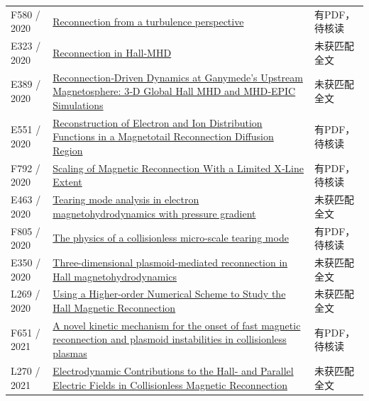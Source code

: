 \begin{longtable}{P{24mm}P{97mm}P{27mm}}
F580 / 2020 & \href{https://doi.org/10.1063/1.5128376}{Reconnection from a turbulence perspective} & 有PDF，待核读\\

E323 / 2020 & \href{http://absimage.aps.org/image/DPP20/MWS_DPP20-2020-001941.pdf}{Reconnection in Hall-MHD} & 未获匹配全文\\

E389 / 2020 & \href{https://doi.org/10.1029/2020ja028162}{Reconnection‐Driven Dynamics at Ganymede's Upstream Magnetosphere: 3‐D Global Hall MHD and MHD‐EPIC Simulations} & 未获匹配全文\\

E551 / 2020 & \href{https://doi.org/10.1029/2020ja027879}{Reconstruction of Electron and Ion Distribution Functions in a Magnetotail Reconnection Diffusion Region} & 有PDF，待核读\\

F792 / 2020 & \href{https://doi.org/10.1029/2020gl088147}{Scaling of Magnetic Reconnection With a Limited X‐Line Extent} & 有PDF，待核读\\

E463 / 2020 & \href{https://doi.org/10.1063/5.0022332}{Tearing mode analysis in electron magnetohydrodynamics with pressure gradient} & 未获匹配全文\\

F805 / 2020 & \href{https://etheses.whiterose.ac.uk/28202/1/Geng_PhD_Thesis.pdf}{The physics of a collisionless micro-scale tearing mode} & 有PDF，待核读\\

E350 / 2020 & \href{http://absimage.aps.org/image/DPP20/MWS_DPP20-2020-001547.pdf}{Three-dimensional plasmoid-mediated reconnection in Hall magnetohydrodynamics} & 未获匹配全文\\

L269 / 2020 & \href{https://doi.org/10.3847/1538-4357/ab7551}{Using a Higher-order Numerical Scheme to Study the Hall Magnetic Reconnection} & 未获匹配全文\\

F651 / 2021 & \href{https://doi.org/10.48550/arxiv.2112.03316}{A novel kinetic mechanism for the onset of fast magnetic reconnection and plasmoid instabilities in collisionless plasmas} & 有PDF，待核读\\

L270 / 2021 & \href{https://doi.org/10.1029/2021ja029550}{Electrodynamic Contributions to the Hall‐ and Parallel Electric Fields in Collisionless Magnetic Reconnection} & 未获匹配全文\\


\end{longtable}
